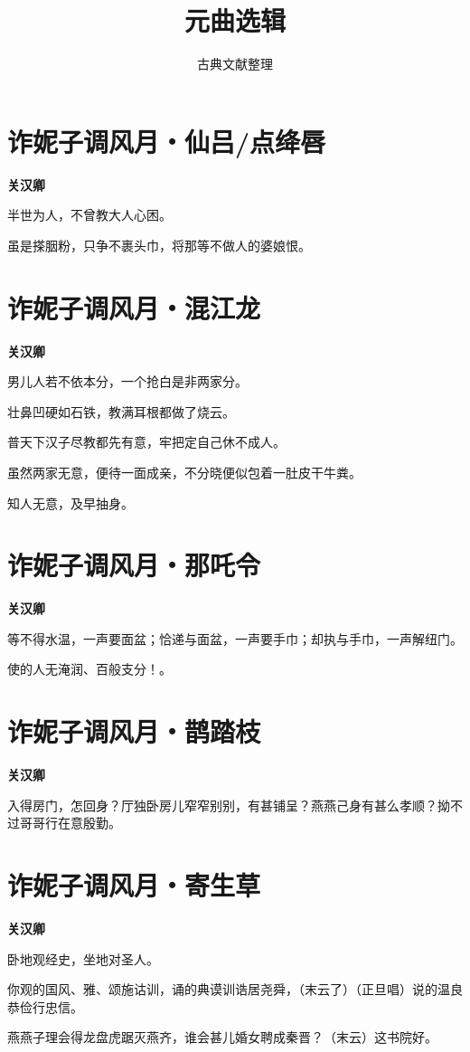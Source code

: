\documentclass[12pt,a4paper]{ctexbook}
\title{元曲选辑}
\author{古典文献整理}
\date{}
\begin{document}
\maketitle
\tableofcontents
\newpage
\section{诈妮子调风月・仙吕/点绛唇}
\textbf{关汉卿}\par\vspace{0.5em}
半世为人，不曾教大人心困。\par
虽是搽胭粉，只争不裹头巾，将那等不做人的婆娘恨。\par

\section{诈妮子调风月・混江龙}
\textbf{关汉卿}\par\vspace{0.5em}
男儿人若不依本分，一个抢白是非两家分。\par
壮鼻凹硬如石铁，教满耳根都做了烧云。\par
普天下汉子尽教都先有意，牢把定自己休不成人。\par
虽然两家无意，便待一面成亲，不分晓便似包着一肚皮干牛粪。\par
知人无意，及早抽身。\par

\section{诈妮子调风月・那吒令}
\textbf{关汉卿}\par\vspace{0.5em}
等不得水温，一声要面盆；恰递与面盆，一声要手巾；却执与手巾，一声解纽门。\par
使的人无淹润、百般支分！。\par

\section{诈妮子调风月・鹊踏枝}
\textbf{关汉卿}\par\vspace{0.5em}
入得房门，怎回身？厅独卧房儿窄窄别别，有甚铺呈？燕燕己身有甚么孝顺？拗不过哥哥行在意殷勤。\par

\section{诈妮子调风月・寄生草}
\textbf{关汉卿}\par\vspace{0.5em}
卧地观经史，坐地对圣人。\par
你观的国风、雅、颂施诂训，诵的典谟训诰居尧舜，（末云了）（正旦唱）说的温良恭俭行忠信。\par
燕燕子理会得龙盘虎踞灭燕齐，谁会甚儿婚女聘成秦晋？（末云）这书院好。\par
\end{document}
